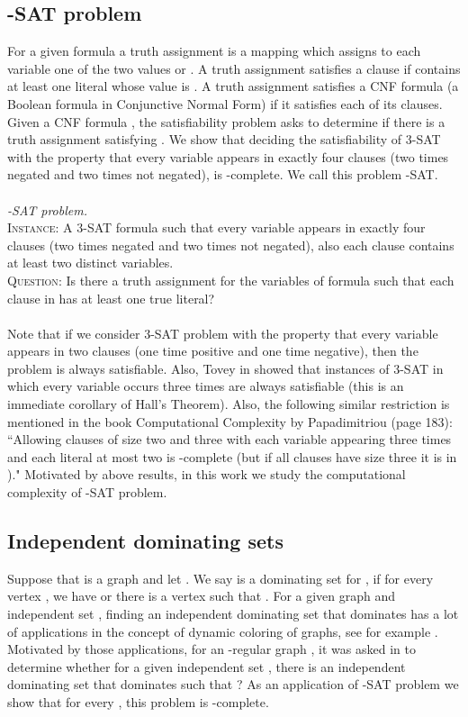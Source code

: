 \documentclass[
final
]{dmtcs-episciences}
\begin{document}
\subsection{-SAT problem}

For a given formula   a truth assignment is a mapping which
assigns to each variable one of the two values  or .
A truth assignment satisfies a clause  if  contains at
least one literal whose value is .
A truth assignment satisfies a CNF formula (a
Boolean formula in Conjunctive Normal Form) if it satisfies
each of its clauses. Given a CNF formula , the satisfiability
problem asks to determine if there is a truth assignment
satisfying .
We show that deciding the satisfiability of 3-SAT with the property that every variable appears in exactly four clauses (two times negated and two times not negated), is -complete. We call this problem -SAT.
\\ \\
{\em -SAT problem.}\\
\textsc{Instance}: A 3-SAT formula  such that  every variable appears in exactly four clauses (two times negated and two times not negated),  also each clause contains at least two distinct variables. \\
\textsc{Question}: Is there a truth assignment for the variables  of formula  such that each clause in  has at least one  true literal?
\\ \\
Note that if we consider  3-SAT problem  with the property that every variable appears in two clauses (one time positive and one time negative), then the problem is always  satisfiable.
Also, Tovey in \cite{tovey1984simplified} showed that
instances of 3-SAT in which every variable occurs three times are always satisfiable (this is an immediate corollary
of Hall's Theorem).
Also, the following similar restriction is mentioned in the book Computational Complexity by Papadimitriou (page
183): ``Allowing clauses of size two and three with each variable appearing three times and each
literal at most two is  -complete (but if all clauses have size three it is in )." Motivated by above results, in this work  we study the computational complexity of -SAT problem.

\subsection{Independent dominating sets}

Suppose that  is a  graph and let .
We say  is a dominating set for , if
for every vertex , we have  or there is a vertex  such that . 
For a given graph  and independent set , finding an independent dominating set  that dominates  has a lot of applications in the concept of dynamic coloring of graphs, see for example \cite{MR2935408, dehhh, MR3679602}. 
Motivated by those applications, 
for an -regular graph ,  it was asked in \cite{dehhh} to determine whether for a given independent set , there is an independent dominating set  that dominates  such that ?
As an application of -SAT problem we show that  for every , this problem is  -complete.
\end{document}
